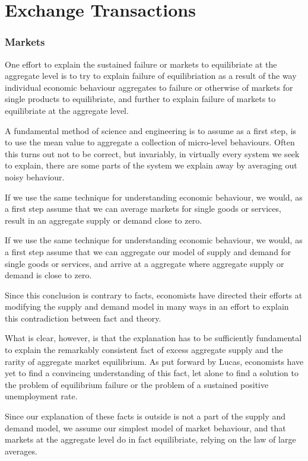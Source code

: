 \chapter{Exchange Transactions}

\subsection{Markets}

One effort to explain the sustained failure or markets to equilibriate at the aggregate level is to
try to explain failure of equilibriation as a result of the way individual economic behaviour
aggregates to failure or otherwise of markets for single products to equilibriate, and further to
explain failure of markets to equilibriate at the aggregate level.

A fundamental method of science and engineering is to assume as a first step, is to use the mean
value to aggregate a collection of micro-level behaviours. Often this turns out not to be correct,
but invariably, in virtually every system we seek to explain, there are some parts of the system we
explain away by averaging out noisy behaviour. 

If we use the same technique for understanding economic behaviour, we would, as a first step assume
that we can average markets for single goods or services, result in an aggregate supply or demand
close to zero.

If we use the same technique for understanding economic behaviour, we would, as a first step assume
that we can aggregate our model of supply and demand for single goods or services, and arrive at a
aggregate where aggregate supply or demand is close to zero.

Since this conclusion is contrary to facts, economists have directed their efforts at modifying the
supply and demand model in many ways in an effort to explain this contradiction between fact and
theory.

What is clear, however, is that the explanation has to be sufficiently fundamental to explain the
remarkably consistent fact of excess aggregate supply and the rarity of aggregate market
equilibrium. As put forward by Lucas, economists have yet to find a convincing understanding of
this fact, let alone to find a solution to the problem of equilibrium failure or the problem of
a sustained positive unemployment rate. 

Since our explanation of these facts is outside is not a part of the supply and demand model, we
assume our simplest model of market behaviour, and that markets at the aggregate level do in fact
equilibriate, relying on the law of large averages.

